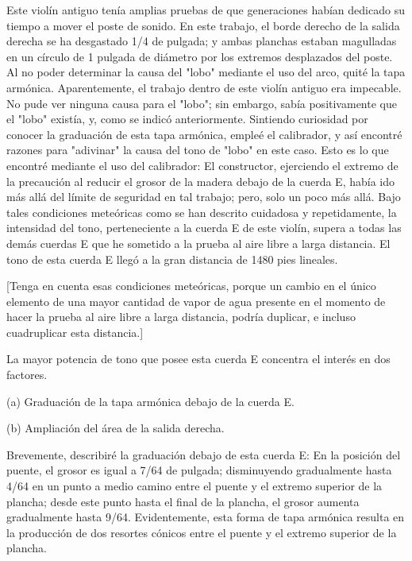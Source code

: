 \documentclass[12pt]{book}
\begin{document}
Este violín antiguo tenía amplias pruebas de que generaciones habían dedicado su tiempo a mover el poste de sonido. En este trabajo, el borde derecho de la salida derecha se ha desgastado 1/4 de pulgada; y ambas planchas estaban magulladas en un círculo de 1 pulgada de diámetro por los extremos desplazados del poste. Al no poder determinar la causa del "lobo" mediante el uso del arco, quité la tapa armónica. Aparentemente, el trabajo dentro de este violín antiguo era impecable. No pude ver ninguna causa para el "lobo"; sin embargo, sabía positivamente que el "lobo" existía, y, como se indicó anteriormente. Sintiendo curiosidad por conocer la graduación de esta tapa armónica, empleé el calibrador, y así encontré razones para "adivinar" la causa del tono de "lobo" en este caso. Esto es lo que encontré mediante el uso del calibrador: El constructor, ejerciendo el extremo de la precaución al reducir el grosor de la madera debajo de la cuerda E, había ido más allá del límite de seguridad en tal trabajo; pero, solo un poco más allá. Bajo tales condiciones meteóricas como se han descrito cuidadosa y repetidamente, la intensidad del tono, perteneciente a la cuerda E de este violín, supera a todas las demás cuerdas E que he sometido a la prueba al aire libre a larga distancia. El tono de esta cuerda E llegó a la gran distancia de 1480 pies lineales.

[Tenga en cuenta esas condiciones meteóricas, porque un cambio en el único elemento de una mayor cantidad de vapor de agua presente en el momento de hacer la prueba al aire libre a larga distancia, podría duplicar, e incluso cuadruplicar esta distancia.]

La mayor potencia de tono que posee esta cuerda E concentra el interés en dos factores.

(a) Graduación de la tapa armónica debajo de la cuerda E.

(b) Ampliación del área de la salida derecha.

Brevemente, describiré la graduación debajo de esta cuerda E: En la posición del puente, el grosor es igual a 7/64 de pulgada; disminuyendo gradualmente hasta 4/64 en un punto a medio camino entre el puente y el extremo superior de la plancha; desde este punto hasta el final de la plancha, el grosor aumenta gradualmente hasta 9/64. Evidentemente, esta forma de tapa armónica resulta en la producción de dos resortes cónicos entre el puente y el extremo superior de la plancha.
\end{document}
